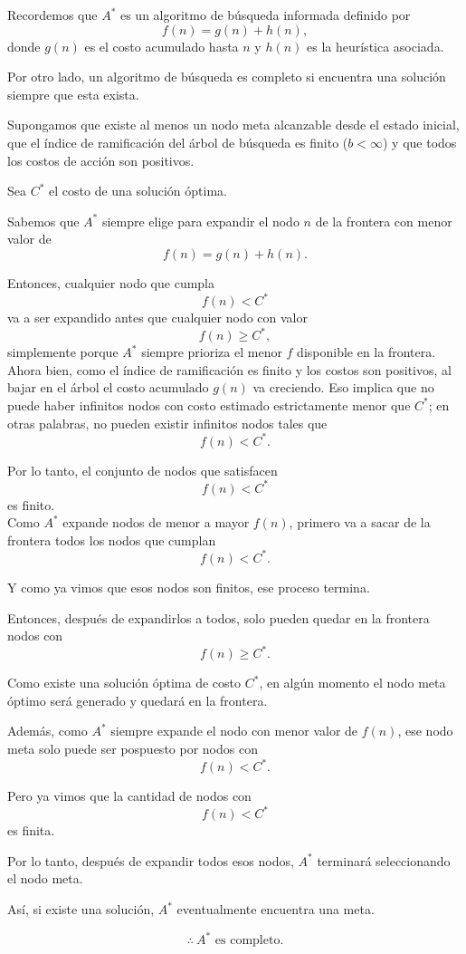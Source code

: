 Recordemos que $A^*$ es un algoritmo de búsqueda informada definido por
\[
f(n)=g(n)+h(n),
\]
donde $g(n)$ es el costo acumulado hasta $n$ y $h(n)$ es la heurística asociada.

Por otro lado, un algoritmo de búsqueda es completo si encuentra una solución siempre que esta exista.\\


Supongamos que existe al menos un nodo meta alcanzable desde el estado inicial, que el índice de ramificación del árbol de búsqueda es finito ($b<\infty$) y que todos los costos de acción son positivos.

Sea $C^*$ el costo de una solución óptima.

Sabemos que $A^*$ siempre elige para expandir el nodo $n$ de la frontera con menor valor de
\[
f(n)=g(n)+h(n).
\]

Entonces, cualquier nodo que cumpla
\[
f(n)<C^*
\]
va a ser expandido antes que cualquier nodo con valor
\[
f(n)\geq C^*,
\]
simplemente porque $A^*$ siempre prioriza el menor $f$ disponible en la frontera.\\

Ahora bien, como el índice de ramificación es finito y los costos son positivos, al bajar en el árbol el costo acumulado $g(n)$ va creciendo. Eso implica que no puede haber infinitos nodos con costo estimado estrictamente menor que $C^*$; en otras palabras, no pueden existir infinitos nodos tales que
\[
f(n)<C^*.
\]

Por lo tanto, el conjunto de nodos que satisfacen
\[
f(n)<C^*
\]
es finito.\\

Como $A^*$ expande nodos de menor a mayor $f(n)$, primero va a sacar de la frontera todos los nodos que cumplan
\[
f(n)<C^*.
\]

Y como ya vimos que esos nodos son finitos, ese proceso termina.

Entonces, después de expandirlos a todos, solo pueden quedar en la frontera nodos con
\[
f(n)\geq C^*.
\]

Como existe una solución óptima de costo $C^*$, en algún momento el nodo meta óptimo será generado y quedará en la frontera.

Además, como $A^*$ siempre expande el nodo con menor valor de $f(n)$, ese nodo meta solo puede ser pospuesto por nodos con
\[
f(n)<C^*.
\]

Pero ya vimos que la cantidad de nodos con
\[
f(n)<C^*
\]
es finita.

Por lo tanto, después de expandir todos esos nodos, $A^*$ terminará seleccionando el nodo meta.

Así, si existe una solución, $A^*$ eventualmente encuentra una meta.

\[
\therefore\ A^* \text{ es completo.}
\]
